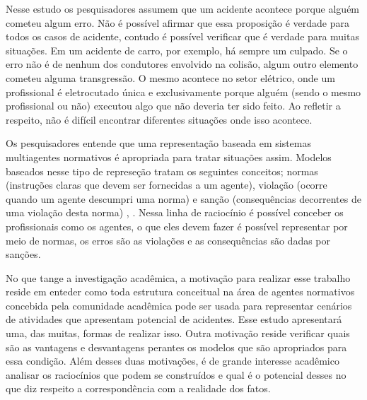 Nesse estudo os pesquisadores assumem que um acidente acontece porque alguém cometeu algum erro. Não é possível afirmar que essa proposição é verdade para todos os casos de acidente, contudo é possível verificar que é verdade para muitas situações. Em um acidente de carro, por exemplo, há sempre um culpado. Se o erro não é de nenhum dos condutores envolvido na colisão, algum outro elemento cometeu alguma transgressão. O mesmo acontece no setor elétrico, onde um profissional é eletrocutado única e exclusivamente porque alguém (sendo o mesmo profissional ou não) executou algo que não deveria ter sido feito. Ao refletir a respeito, não é difícil encontrar diferentes situações onde isso acontece. 

Os pesquisadores entende que uma representação baseada em sistemas multiagentes normativos é apropriada para tratar situações assim. Modelos baseados nesse tipo de represeção tratam os seguintes conceitos; normas (instruções claras que devem ser fornecidas a um agente), violação (ocorre quando um agente descumpri uma norma) e sanção (consequências decorrentes de uma violação desta norma) \cite{dastaniframework} \cite{amodelmultiagentsystemdynamicrelationship}, \cite{ontologynormative}. Nessa linha de raciocínio é possível 
conceber os profissionais como os agentes, o que eles devem fazer é possível representar por meio de normas, os erros são as violações e as consequências são dadas por sanções.  

No que tange a investigação acadêmica, a motivação para realizar esse trabalho reside em enteder como toda estrutura conceitual na área de agentes normativos concebida pela comunidade acadêmica pode ser usada para representar cenários de atividades que apresentam potencial de acidentes. Esse estudo apresentará uma, das muitas, formas de realizar isso. Outra motivação reside verificar quais são as vantagens e desvantagens perantes os modelos que são apropriados para essa condição. Além desses duas motivações, é de grande interesse acadêmico analisar os raciocínios que podem se construídos e qual é o potencial desses no que diz respeito a correspondência com a realidade dos fatos. 